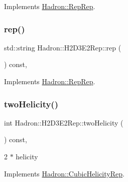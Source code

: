Implements \mbox{\hyperlink{structHadron_1_1RepRep_ab3213025f6de249f7095892109575fde}{Hadron\+::\+Rep\+Rep}}.

\mbox{\label{structHadron_1_1H2D3E2Rep_a1e87b376344ff9529dd7f69395f739fa}} 
\subsubsection{\texorpdfstring{rep()}{rep()}\hspace{0.1cm}{\footnotesize\ttfamily [5/5]}}
{\footnotesize\ttfamily std\+::string Hadron\+::\+H2\+D3\+E2\+Rep\+::rep (\begin{DoxyParamCaption}{ }\end{DoxyParamCaption}) const\hspace{0.3cm}{\ttfamily [inline]}, {\ttfamily [virtual]}}



Implements \mbox{\hyperlink{structHadron_1_1RepRep_ab3213025f6de249f7095892109575fde}{Hadron\+::\+Rep\+Rep}}.

\mbox{\label{structHadron_1_1H2D3E2Rep_a85b69c72b8a1e18f12947d11de0e6561}} 
\subsubsection{\texorpdfstring{twoHelicity()}{twoHelicity()}\hspace{0.1cm}{\footnotesize\ttfamily [1/3]}}
{\footnotesize\ttfamily int Hadron\+::\+H2\+D3\+E2\+Rep\+::two\+Helicity (\begin{DoxyParamCaption}{ }\end{DoxyParamCaption}) const\hspace{0.3cm}{\ttfamily [inline]}, {\ttfamily [virtual]}}

2 $\ast$ helicity 

Implements \mbox{\hyperlink{structHadron_1_1CubicHelicityRep_af507aa56fc2747eacc8cb6c96db31ecc}{Hadron\+::\+Cubic\+Helicity\+Rep}}.

\mbox{\label{structHadron_1_1H2D3E2Rep_a85b69c72b8a1e18f12947d11de0e6561}} 
